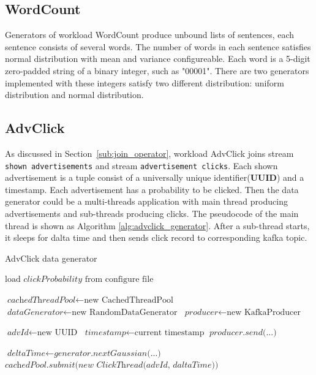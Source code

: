\subsection{WordCount}

Generators of workload WordCount produce unbound lists of sentences, each sentence consists of several words. The number of words in each sentence satisfies normal distribution with mean and variance configureable. Each word is a 5-digit zero-padded string of a binary integer, such as "00001". There are two generators implemented with these integers satisfy two different distribution: uniform distribution and normal distribution.

\subsection{AdvClick}

As discussed in Section~\ref{sub:join_operator}, workload AdvClick joins stream \texttt{shown advertisements} and stream \texttt{advertisement clicks}. Each shown advertisement is a tuple consist of a universally unique identifier(\textbf{UUID}) and a timestamp. Each advertisement has a probability to be clicked. Then the data generator could be a multi-threads application with main thread producing advertisements and sub-threads producing clicks. The pseudocode of the main thread is shown as Algorithm \ref{alg:advclick_generator}. After a sub-thread starts, it sleeps for dalta time and then sends click record to corresponding kafka topic. 

\begin{algorithm}
\caption{AdvClick data generator}\label{euclid}
\label{alg:advclick_generator}
\begin{algorithmic}[1]
\State $\text{load } \textit{clickProbability} \text{ from configure file}$

\State $\textit{cachedThreadPool} \gets \text{new CachedThreadPool}$
\State $\textit{dataGenerator} \gets \text{new RandomDataGenerator}$ 
\State $\textit{producer} \gets \text{new KafkaProducer}$ 

\State $\textit{advId} \gets \text{new UUID}$ 
\State $\textit{timestamp} \gets \text{current timestamp}$ 
\State $\textit{producer.send(...)}$ 

\State $\textit{deltaTime} \gets \textit{generator.nextGaussian(...)}$ 
\State $\textit{cachedPool.submit(new ClickThread(advId, daltaTime))} $ 
\EndIf
\EndWhile
\end{algorithmic}
\end{algorithm}


